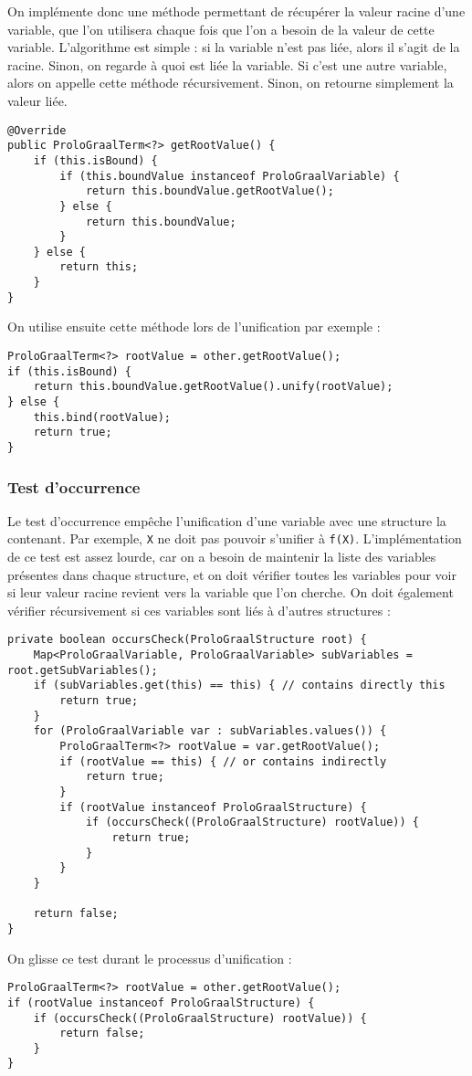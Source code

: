 \documentclass[../report.tex]{subfiles}
\begin{document}
On implémente donc une méthode permettant de récupérer la valeur racine d'une variable, que l'on utilisera chaque fois que l'on a besoin de la valeur de cette variable. L'algorithme est simple : si la variable n'est pas liée, alors il s'agit de la racine. Sinon, on regarde à quoi est liée la variable. Si c'est une autre variable, alors on appelle cette méthode récursivement. Sinon, on retourne simplement la valeur liée.
\begin{verbatim}
@Override
public ProloGraalTerm<?> getRootValue() {
    if (this.isBound) {
        if (this.boundValue instanceof ProloGraalVariable) {
            return this.boundValue.getRootValue();
        } else {
            return this.boundValue;
        }
    } else {
        return this;
    }
}
\end{verbatim}
On utilise ensuite cette méthode lors de l'unification par exemple :
\begin{verbatim}
ProloGraalTerm<?> rootValue = other.getRootValue();
if (this.isBound) {
    return this.boundValue.getRootValue().unify(rootValue);
} else {
    this.bind(rootValue);
    return true;
}
\end{verbatim}
\subsubsection{Test d'occurrence}
Le test d'occurrence empêche l'unification d'une variable avec une structure la contenant. Par exemple, \texttt{X} ne doit pas pouvoir s'unifier à \texttt{f(X)}. L'implémentation de ce test est assez lourde, car on a besoin de maintenir la liste des variables présentes dans chaque structure, et on doit vérifier toutes les variables pour voir si leur valeur racine revient vers la variable que l'on cherche. On doit également vérifier récursivement si ces variables sont liés à d'autres structures :
\begin{verbatim}
private boolean occursCheck(ProloGraalStructure root) {
    Map<ProloGraalVariable, ProloGraalVariable> subVariables = root.getSubVariables();
    if (subVariables.get(this) == this) { // contains directly this
        return true;
    }
    for (ProloGraalVariable var : subVariables.values()) {
        ProloGraalTerm<?> rootValue = var.getRootValue();
        if (rootValue == this) { // or contains indirectly
            return true;
        }
        if (rootValue instanceof ProloGraalStructure) {
            if (occursCheck((ProloGraalStructure) rootValue)) {
                return true;
            }
        }
    }

    return false;
}
\end{verbatim}
On glisse ce test durant le processus d'unification :
\begin{verbatim}
ProloGraalTerm<?> rootValue = other.getRootValue();
if (rootValue instanceof ProloGraalStructure) {
    if (occursCheck((ProloGraalStructure) rootValue)) {
        return false;
    }
}
\end{verbatim}
\end{document}
